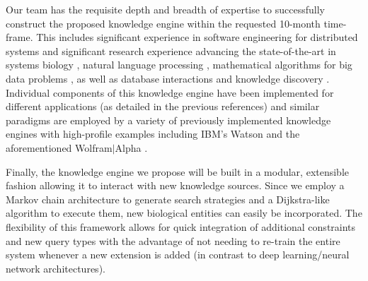 \documentclass[11pt,notitlepage]{article}
\begin{document}
Our team has the requisite depth and breadth of expertise to successfully
construct the proposed knowledge engine within the requested 10-month
time-frame.  This includes significant experience in software engineering for
distributed systems and significant research experience advancing the
state-of-the-art in systems biology
\cite{ramsey2010systems,hwang2005data1,hwang2005data2,de2004evolution}, natural
language processing
\cite{huang2012structured,huang2010dynamic,mi2008forest,huang2007forest},
mathematical algorithms for big data problems
\cite{koslicki2014wgsquikr,holzinger2014entropy,koslicki2015coding,koslicki2013quikr,koslicki2017improving},
as well as database interactions and knowledge discovery
\cite{nandi2011guided,nandi2007effective,jagadish2007making,nandi2007assisted}. Individual
components of this knowledge engine have been implemented for different
applications (as detailed in the previous references) and similar paradigms are
employed by a variety of previously implemented knowledge engines with
high-profile examples including IBM's Watson \cite{ferrucci2010building} and the
aforementioned Wolfram$|$Alpha \cite{Wolframalpha}.

Finally, the knowledge engine we propose will be built in a modular, extensible
fashion allowing it to interact with new knowledge sources. Since we employ a
Markov chain architecture to generate search strategies and a Dijkstra-like
algorithm to execute them, new biological entities can easily be
incorporated. The flexibility of this framework allows for quick integration of
additional constraints and new query types with the advantage of not needing to
re-train the entire system whenever a new extension is added (in contrast to
deep learning/neural network architectures).

\newpage
\end{document}
